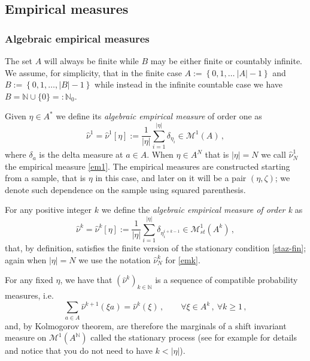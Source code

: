 \documentclass[reqno]{amsart}
\theoremstyle{plain}
\theoremstyle{definition}
\theoremstyle{remark}
\numberwithin{equation}{section}
\numberwithin{theorem}{section}
\renewcommand{\hat}{\widehat}
\newcommand{\<}{\langle}
\renewcommand{\>}{\rangle}
\begin{document}
	\subsection{Empirical measures}
	
	\subsubsection{Algebraic empirical measures}
	The set $A$ will always be finite while $B$ may be either finite or countably infinite.
	We assume, for simplicity, that in the finite case $A:=\left\{0,1, \dots \ |A|-1\right\}$ and $B:=\left\{0,1,\dots ,|B|-1\right\}$ while instead in the infinite countable case we have $B=\mathbb N\cup \{0\}=:\mathbb N_0$.
	
	Given $\eta\in A^*$ we define its {\it algebraic empirical measure} of order one as
	\begin{equation}
		\label{em1}
		\hat\nu^{1}=\hat\nu^{1}[\eta]:=\frac{1}{|\eta|} \sum_{i=1}^{|\eta|}\delta_{\eta_i}\in \mathcal M^1(A)\,,
	\end{equation}
	where  $\delta_a$ is the delta measure at $a\in A$. When $\eta\in A^N$ that is $|\eta|=N$ we call $\hat\nu^{1}_N$ the empirical measure \eqref{em1}. The empirical measures are constructed starting from a sample, that is $\eta$ in this case, and later on it will be a pair $(\eta,\zeta)$; we denote such dependence on the sample using squared parenthesis.
	
	For any positive integer $k$ we define the {\it algebraic empirical measure of order k} as
	\begin{equation}
		\label{emk}
		\hat\nu^{k}=\hat\nu^{k}[\eta]:=\frac{1}{|\eta|} \sum_{i=1}^{|\eta|}\delta_{\eta_i^{i+k-1}}\in \mathcal M^1_{st}(A^k)\,,
	\end{equation}
	that, by definition, satisfies the finite version of the stationary condition \eqref{staz-fin}; again when $|\eta|=N$ we use the notation $\hat\nu^{k}_N$ for \eqref{emk}.
	
	For any fixed $\eta$, we have that $\left(\hat \nu^{k}\right)_{k\in \mathbb N}$ is a sequence of compatible probability measures, i.e.
	\begin{equation}
		\sum_{a\in A}\hat\nu^{k+1}(\xi a)=\hat\nu^{k}(\xi)\,, \qquad \forall \xi\in A^k\,,\ \forall k\geq 1\,,
	\end{equation}
	and, by Kolmogorov theorem, are therefore the marginals of a shift invariant measure on $\mathcal M^1(A^{\mathbb N})$ called the stationary process (see for example \cite{denH} for details and notice that you do not need to have $k<|\eta|$). 
	
\end{document}
